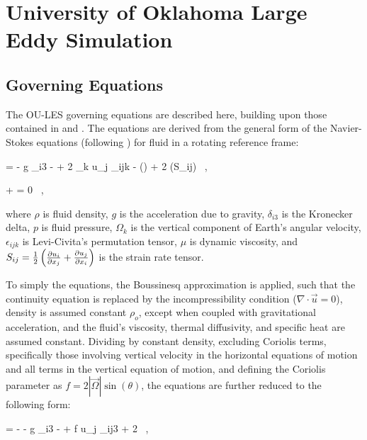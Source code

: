 \chapter{University of Oklahoma Large Eddy Simulation}
\label{les-2}

\section{Governing Equations}
\label{ge-21}

The OU-LES governing equations are described here, building upon those contained in  \citet{Conzemius2004} and  \citet{Wilson2012a}. The equations are derived from the general form of the Navier-Stokes equations (following \citealt{Kundu}) for fluid in a rotating reference frame:


\be
\rho {} = - \rho g \delta_{i3} -  + 2 \rho \Omega_k u_j \epsilon_{ijk} - (\mu \nabla \cdot {}) + 2 (\mu S_{ij}) \mbox{ ,}
\label{equation201}
\ee

\be
{}  +  = 0 \mbox{ ,}
\label{equation202}
\ee


\noindent where $\rho$ is fluid density, $g$ is the acceleration due to gravity, $\delta_{i3}$ is the Kronecker delta, $p$ is fluid pressure, $\Omega_k$ is the vertical component of Earth's angular velocity, $\epsilon_{ijk}$ is Levi-Civita's permutation tensor, $\mu$ is dynamic viscosity, and $S_{ij} = \frac{1}{2}\left(\frac{\partial u_i}{\partial x_j} + \frac{\partial u_j}{\partial x_i}\right)$ is the strain rate tensor.

To simply the equations, the Boussinesq approximation is applied, such that the continuity equation is replaced by the incompressibility condition ($\nabla \cdot \vec{u} = 0$), density is assumed constant $\rho_o$, except when coupled with gravitational acceleration, and the fluid's viscosity, thermal diffusivity, and specific heat are assumed constant. Dividing by constant density, excluding Coriolis terms, specifically those involving vertical velocity in the horizontal equations of motion and all terms in the vertical equation of motion, and defining the Coriolis parameter as $f = 2 \left|\vec{\Omega}\right|\sin (\theta)$, the equations are further reduced to the following form:


\be
{} = - -  g \delta_{i3} -   + f u_j \epsilon_{ij3} + 2 \nu {} \mbox{ ,}
\label{equation203}
\ee


